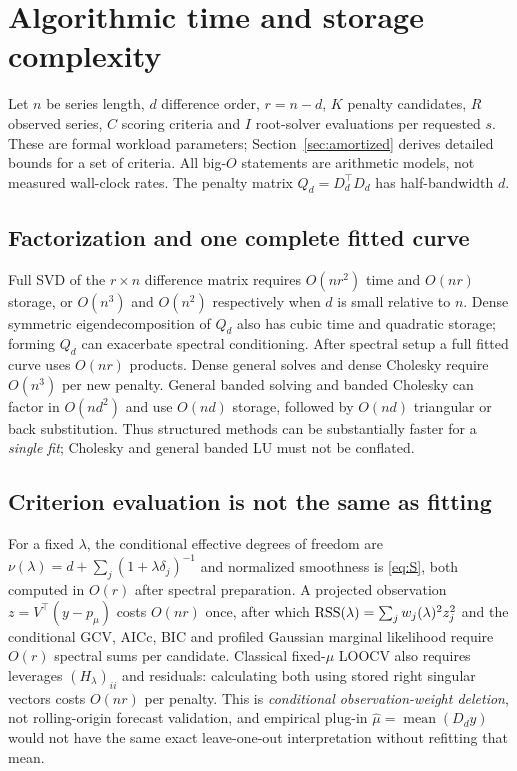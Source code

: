 \section{Algorithmic time and storage complexity}\label{sec:complexity}
Let $n$ be series length, $d$ difference order, $r=n-d$, $K$ penalty candidates, $R$ observed series, $C$ scoring criteria and $I$ root-solver evaluations per requested $s$. These are formal workload parameters; Section~\ref{sec:amortized} derives detailed bounds for a set of criteria. All big-$O$ statements are arithmetic models, not measured wall-clock rates. The penalty matrix $Q_d=D_d^\top D_d$ has half-bandwidth $d$.

\subsection{Factorization and one complete fitted curve}
Full SVD of the $r\times n$ difference matrix requires $O(nr^2)$ time and $O(nr)$ storage, or $O(n^3)$ and $O(n^2)$ respectively when $d$ is small relative to $n$. Dense symmetric eigendecomposition of $Q_d$ also has cubic time and quadratic storage; forming $Q_d$ can exacerbate spectral conditioning. After spectral setup a full fitted curve uses $O(nr)$ products. Dense general solves and dense Cholesky require $O(n^3)$ per new penalty. General banded solving and banded Cholesky can factor in $O(nd^2)$ and use $O(nd)$ storage, followed by $O(nd)$ triangular or back substitution. Thus structured methods can be substantially faster for a \emph{single fit}; Cholesky and general banded LU must not be conflated.

\subsection{Criterion evaluation is not the same as fitting}
For a fixed $\lambda$, the conditional effective degrees of freedom are $\nu(\lambda)=d+\sum_j(1+\lambda\delta_j)^{-1}$ and normalized smoothness is \eqref{eq:S}, both computed in $O(r)$ after spectral preparation. A projected observation $z=V^\top(y-p_\mu)$ costs $O(nr)$ once, after which $\operatorname{RSS}(\lambda)=\sum_j w_j(\lambda)^2 z_j^2$ and the conditional GCV, AICc, BIC and profiled Gaussian marginal likelihood require $O(r)$ spectral sums per candidate. Classical fixed-$\mu$ LOOCV also requires leverages $(H_\lambda)_{ii}$ and residuals: calculating both using stored right singular vectors costs $O(nr)$ per penalty. This is \emph{conditional observation-weight deletion}, not rolling-origin forecast validation, and empirical plug-in $\widehat\mu=\operatorname{mean}(D_dy)$ would not have the same exact leave-one-out interpretation without refitting that mean.


